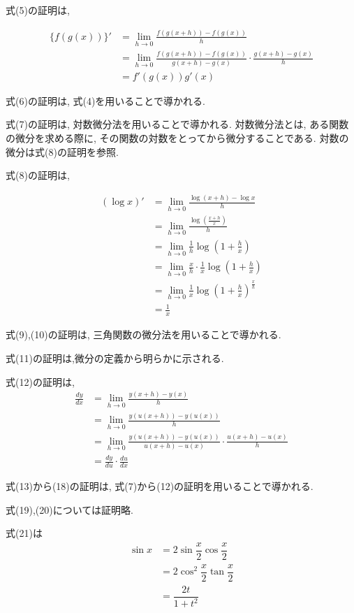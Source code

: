 ﻿\documentclass[dvipdfmx,a4paper,11pt,fleqn]{jsarticle}
\begin{document}
式(5)の証明は,

\begin{align*}
  \{f(g(x))\}'
  &=\lim_{h\to0}
  \frac{f(g(x+h))-f(g(x))}{h}\\
  &=\lim_{h\to0}
  \frac{f(g(x+h))-f(g(x))}
       {g(x+h)-g(x)}
  \cdot
  \frac{g(x+h)-g(x)}{h}\\
  &=f'(g(x))g'(x)
\end{align*}

式(6)の証明は, 式(4)を用いることで導かれる.

式(7)の証明は, 対数微分法を用いることで導かれる.
対数微分法とは, ある関数の微分を求める際に, その関数の対数をとってから微分することである.
対数の微分は式(8)の証明を参照.

式(8)の証明は,

\begin{align*}
  (\log x)'
  &=\lim_{h\to0}
  \frac{\log(x+h)-\log x}{h}\\
  &=\lim_{h\to0}
  \frac{\log\left(\frac{x+h}{x}\right)}{h}\\
  &=\lim_{h\to0}
  \frac{1}{h}
  \log\left(1+\frac{h}{x}\right)\\
  &=\lim_{h\to0}
  \frac{x}{h}\cdot
  \frac{1}{x}
  \log\left(1+\frac{h}{x}\right)\\
  &=\lim_{h\to0}
  \frac{1}{x}
  \log\left(
    1+\frac{h}{x}
  \right)^{\frac{x}{h}}\\
  &=\frac{1}{x}
\end{align*}

式(9),(10)の証明は, 三角関数の微分法を用いることで導かれる.

式(11)の証明は,微分の定義から明らかに示される.

式(12)の証明は,
\begin{align*}
  \frac{dy}{dx}
  &=\lim_{h\to0}
  \frac{y(x+h)-y(x)}{h}\\
  &=\lim_{h\to0}
  \frac{y(u(x+h))-y(u(x))}{h}\\
  &=\lim_{h\to0}
  \frac{y(u(x+h))-y(u(x))}
       {u(x+h)-u(x)}
  \cdot
  \frac{u(x+h)-u(x)}{h}\\
  &=\frac{dy}{du}\cdot\frac{du}{dx}
\end{align*}

式(13)から(18)の証明は, 式(7)から(12)の証明を用いることで導かれる.

式(19),(20)については証明略.

式(21)は
\begin{align*}
  \sin x &= 2\sin\dfrac{x}{2}\cos\dfrac{x}{2}\\
  &= 2\cos^2\dfrac{x}{2}\tan\dfrac{x}{2}\\
  &= \dfrac{2t}{1+t^2}
\end{align*}
\end{document}
